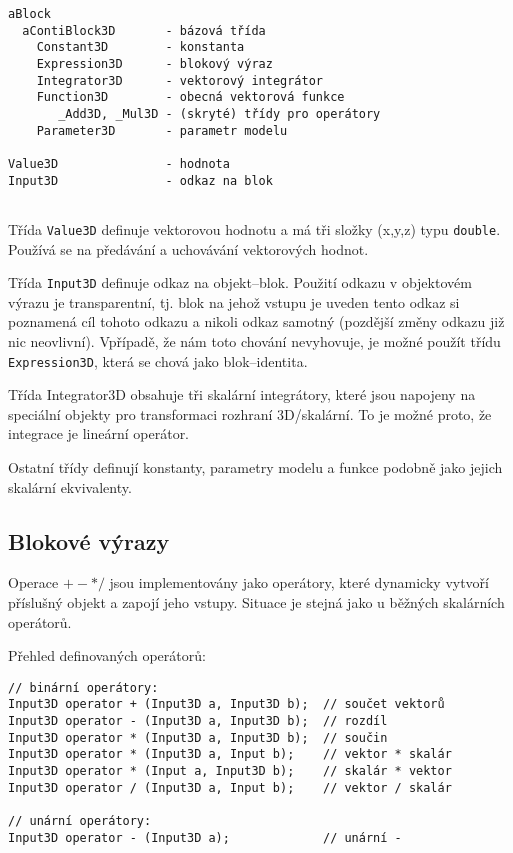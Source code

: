 \documentclass[a4paper]{article}
\begin{document}
\begin{verbatim}
aBlock
  aContiBlock3D       - bázová třída
    Constant3D        - konstanta
    Expression3D      - blokový výraz
    Integrator3D      - vektorový integrátor 
    Function3D        - obecná vektorová funkce
       _Add3D, _Mul3D - (skryté) třídy pro operátory
    Parameter3D       - parametr modelu
                 
Value3D               - hodnota
Input3D               - odkaz na blok
    
\end{verbatim}

Třída \verb|Value3D| definuje vektorovou hodnotu a má tři složky (x,y,z) typu
\verb|double|. Používá se na předávání a uchovávání vektorových hodnot.

Třída \verb|Input3D| definuje odkaz na objekt--blok. Použití odkazu v
objektovém výrazu je transparentní, tj. blok na jehož vstupu je uveden tento
odkaz si poznamená cíl tohoto odkazu a nikoli odkaz samotný (pozdější změny
odkazu již nic neovlivní). Vpřípadě, že nám toto chování nevyhovuje, je
možné použít třídu \verb|Expression3D|, která se chová jako blok--identita.

Třída Integrator3D obsahuje tři skalární integrátory, které jsou napojeny na
speciální objekty pro transformaci rozhraní 3D/skalární. To je možné proto, že
integrace je lineární operátor.

Ostatní třídy definují konstanty, parametry modelu a funkce podobně jako
jejich skalární ekvivalenty.


\subsection{Blokové výrazy}

Operace $ + - * /$ jsou implementovány jako operátory, které dynamicky vytvoří
příslušný objekt a zapojí jeho vstupy. Situace je stejná jako u běžných
skalárních operátorů. 

Přehled definovaných operátorů:

{
\small
\begin{verbatim}
// binární operátory:
Input3D operator + (Input3D a, Input3D b);  // součet vektorů
Input3D operator - (Input3D a, Input3D b);  // rozdíl
Input3D operator * (Input3D a, Input3D b);  // součin
Input3D operator * (Input3D a, Input b);    // vektor * skalár
Input3D operator * (Input a, Input3D b);    // skalár * vektor
Input3D operator / (Input3D a, Input b);    // vektor / skalár

// unární operátory:
Input3D operator - (Input3D a);             // unární -
\end{verbatim}
}
\end{document}
